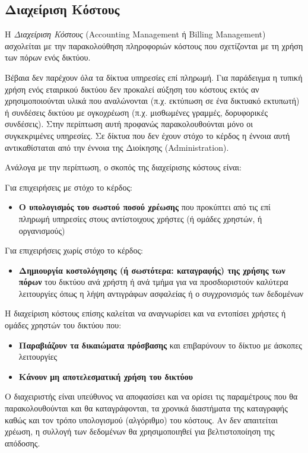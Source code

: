 %
%
\subsection{Διαχείριση Κόστους}

\begin{inthebox}
Η \emph{Διαχείριση Κόστους} (Accounting Management ή Billing Management) ασχολείται με την παρακολούθηση πληροφοριών κόστους που σχετίζονται με τη χρήση των πόρων ενός δικτύου.\\
\end{inthebox}

Βέβαια δεν παρέχουν όλα τα δίκτυα υπηρεσίες επί πληρωμή. Για παράδειγμα η τυπική χρήση ενός εταιρικού δικτύου δεν προκαλεί αύξηση του κόστους εκτός αν χρησιμοποιούνται υλικά που αναλώνονται (π.χ. εκτύπωση σε ένα δικτυακό εκτυπωτή) ή συνδέσεις δικτύου με ογκοχρέωση (π.χ. μισθωμένες γραμμές, δορυφορικές συνδέσεις). Στην περίπτωση αυτή προφανώς παρακολουθούνται μόνο οι συγκεκριμένες υπηρεσίες. Σε δίκτυα που δεν έχουν στόχο το κέρδος η έννοια αυτή αντικαθίσταται από την έννοια της Διοίκησης (Administration). 

Ανάλογα με την περίπτωση, ο σκοπός της διαχείρισης κόστους είναι:

Για επιχειρήσεις με στόχο το κέρδος:

\begin{itemize}
\item \textbf{Ο υπολογισμός του σωστού ποσού χρέωσης} που προκύπτει από τις επί πληρωμή υπηρεσίες στους αντίστοιχους χρήστες (ή ομάδες χρηστών, ή οργανισμούς)
\end{itemize}

Για επιχειρήσεις χωρίς στόχο το κέρδος:

\begin{itemize}
\item \textbf{Δημιουργία κοστολόγησης (ή σωστότερα: καταγραφής) της χρήσης των πόρων} του δικτύου ανά χρήστη ή ανά τμήμα για να προσδιοριστούν καλύτερα λειτουργίες όπως η λήψη αντιγράφων ασφαλείας ή ο συγχρονισμός των δεδομένων
\end{itemize}

Η διαχείριση κόστους επίσης καλείται να αναγνωρίσει και να εντοπίσει χρήστες ή ομάδες χρηστών του δικτύου που:

\begin{itemize}
\item \textbf{Παραβιάζουν τα δικαιώματα πρόσβασης} και επιβαρύνουν το δίκτυο με άσκοπες λειτουργίες
\item \textbf{Κάνουν μη αποτελεσματική χρήση του δικτύου}
\end{itemize}

Ο διαχειριστής είναι υπεύθυνος να αποφασίσει και να ορίσει τις παραμέτρους που θα παρακολουθούνται και θα καταγράφονται, τα χρονικά διαστήματα της καταγραφής καθώς και τον τρόπο υπολογισμού (αλγόριθμο) του κόστους. Αν δεν απαιτείται χρέωση, η συλλογή των δεδομένων θα χρησιμοποιηθεί για βελτιστοποίηση της απόδοσης.